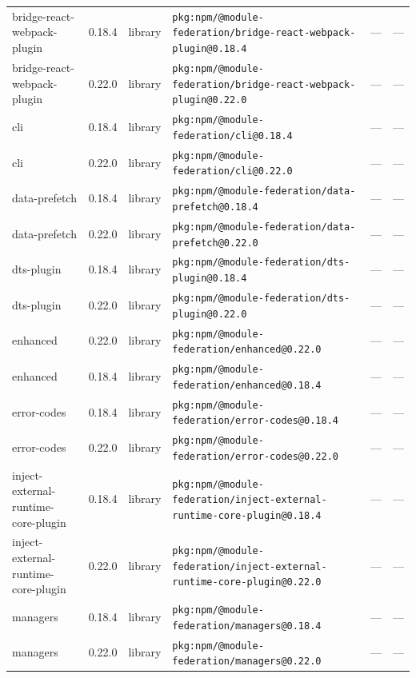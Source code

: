 \documentclass[11pt,a4paper]{article}
\begin{document}
\begin{longtable}{|p{4cm}|p{2cm}|p{1.6cm}|p{5cm}|p{1.5cm}|p{3.5cm}|}
\raggedright bridge-react-webpack-plugin & 0.18.4 & library & \small\texttt{pkg:npm/@module-federation/bridge-react-webpack-plugin@0.18.4} & — & \small — \\
\raggedright bridge-react-webpack-plugin & 0.22.0 & library & \small\texttt{pkg:npm/@module-federation/bridge-react-webpack-plugin@0.22.0} & — & \small — \\
\raggedright cli & 0.18.4 & library & \small\texttt{pkg:npm/@module-federation/cli@0.18.4} & — & \small — \\
\raggedright cli & 0.22.0 & library & \small\texttt{pkg:npm/@module-federation/cli@0.22.0} & — & \small — \\
\raggedright data-prefetch & 0.18.4 & library & \small\texttt{pkg:npm/@module-federation/data-prefetch@0.18.4} & — & \small — \\
\raggedright data-prefetch & 0.22.0 & library & \small\texttt{pkg:npm/@module-federation/data-prefetch@0.22.0} & — & \small — \\
\raggedright dts-plugin & 0.18.4 & library & \small\texttt{pkg:npm/@module-federation/dts-plugin@0.18.4} & — & \small — \\
\raggedright dts-plugin & 0.22.0 & library & \small\texttt{pkg:npm/@module-federation/dts-plugin@0.22.0} & — & \small — \\
\raggedright enhanced & 0.22.0 & library & \small\texttt{pkg:npm/@module-federation/enhanced@0.22.0} & — & \small — \\
\raggedright enhanced & 0.18.4 & library & \small\texttt{pkg:npm/@module-federation/enhanced@0.18.4} & — & \small — \\
\raggedright error-codes & 0.18.4 & library & \small\texttt{pkg:npm/@module-federation/error-codes@0.18.4} & — & \small — \\
\raggedright error-codes & 0.22.0 & library & \small\texttt{pkg:npm/@module-federation/error-codes@0.22.0} & — & \small — \\
\raggedright inject-external-runtime-core-plugin & 0.18.4 & library & \small\texttt{pkg:npm/@module-federation/inject-external-runtime-core-plugin@0.18.4} & — & \small — \\
\raggedright inject-external-runtime-core-plugin & 0.22.0 & library & \small\texttt{pkg:npm/@module-federation/inject-external-runtime-core-plugin@0.22.0} & — & \small — \\
\raggedright managers & 0.18.4 & library & \small\texttt{pkg:npm/@module-federation/managers@0.18.4} & — & \small — \\
\raggedright managers & 0.22.0 & library & \small\texttt{pkg:npm/@module-federation/managers@0.22.0} & — & \small — \\

\end{longtable}
\end{document}
